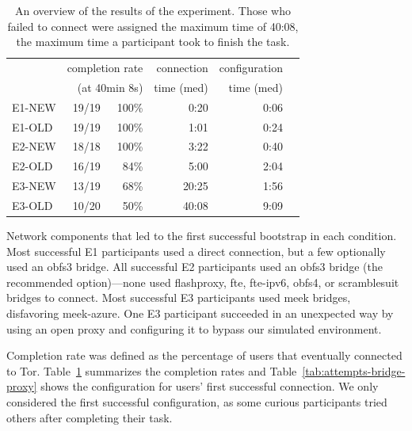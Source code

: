\documentclass[USenglish,oneside,twocolumn]{article}
\begin{document}
\begin{table}[t]
\centering
\begin{tabular}{l r r r r r}
& \multicolumn{2}{r}{completion rate} & \multicolumn{1}{r}{connection} & \multicolumn{1}{r}{configuration} \\
& \multicolumn{2}{r}{(at 40min 8s)} & \multicolumn{1}{r}{time (med)} & \multicolumn{1}{r}{time (med)} \\
\noalign{\hrule}
E1-NEW & 19/19 & 100\% & 0:20 & 0:06 \\
E1-OLD & 19/19 & 100\% & 1:01 & 0:24 \\
E2-NEW & 18/18 & 100\% & 3:22 & 0:40 \\
E2-OLD & 16/19 & 84\% & 5:00 & 2:04 \\
E3-NEW & 13/19 & 68\% & 20:25 & 1:56 \\
E3-OLD & 10/20 & 50\% & 40:08 & 9:09 \\
\end{tabular}
\caption{
An overview of the results of the experiment. Those who
failed to connect were assigned the maximum time of 40:08, 
the maximum time a participant took to finish the task.
}
\label{table:participant-summary}
\end{table}

\begin{table}[t]
\centering

\caption{
Network components that led to the first successful bootstrap
in each condition.
Most successful E1 participants used a direct connection,
but a few optionally used an obfs3 bridge.
All successful E2 participants used 
an obfs3 bridge (the recommended option)---none used 
flashproxy, fte, fte-ipv6, obfs4, or scramblesuit bridges to connect. 
Most successful E3 participants
used meek bridges, disfavoring meek-azure.
One E3 participant succeeded in an unexpected way
by using an open proxy and configuring it to bypass our 
simulated environment.
}
\label{tab:attempts-bridge-proxy}
\end{table}

Completion rate was defined as the percentage of users that eventually connected to Tor. Table~\ref{table:participant-summary} summarizes the completion rates and Table~\ref{tab:attempts-bridge-proxy} shows the configuration for users' first successful connection. We only considered the first successful configuration, as some curious participants tried others after completing their task. 
\end{document}
